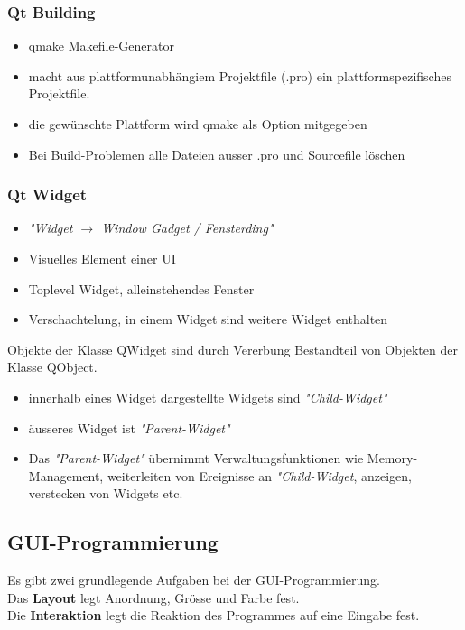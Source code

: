 \subsubsection{Qt Building}
\begin{itemize}
	\item qmake Makefile-Generator
	\item macht aus plattformunabhängiem Projektfile (.pro) ein plattformspezifisches Projektfile. 
	\item die gewünschte Plattform wird qmake als Option mitgegeben
	\item Bei Build-Problemen alle Dateien ausser .pro und Sourcefile löschen
\end{itemize}

\subsubsection{Qt Widget}
\begin{itemize}
	\item \textit{"Widget $\rightarrow$ Window Gadget / Fensterding"}
	\item Visuelles Element einer UI
	\item Toplevel Widget, alleinstehendes Fenster 
	\item Verschachtelung, in einem Widget sind weitere Widget enthalten
\end{itemize}
Objekte der Klasse QWidget sind durch Vererbung Bestandteil von Objekten der Klasse QObject. 
\begin{itemize}
	\item innerhalb eines Widget dargestellte Widgets sind \textit{"Child-Widget"}
	\item äusseres Widget ist \textit{"Parent-Widget"}
	\item Das \textit{"Parent-Widget"} übernimmt Verwaltungsfunktionen wie Memory-Management, weiterleiten von Ereignisse an \textit{"Child-Widget}, anzeigen, verstecken von Widgets etc.
\end{itemize}

\subsection{GUI-Programmierung}
Es gibt zwei grundlegende Aufgaben bei der GUI-Programmierung.\\
Das \textbf{Layout} legt Anordnung, Grösse  und Farbe fest.\\
Die \textbf{Interaktion} legt die Reaktion des Programmes auf eine Eingabe fest. \\
\newpage

